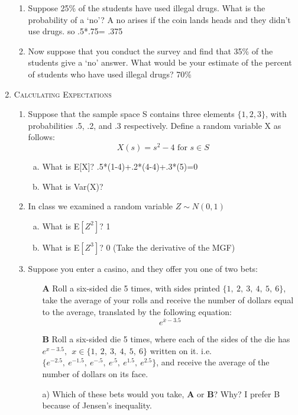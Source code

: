 \documentclass[11pt,letterpaper]{article}
\numberwithin{equation}{section}
\begin{document}
\begin{enumerate}[I]
\begin{enumerate}[1)]
\item Suppose 25\% of the students have used illegal drugs. What is the probability of a `no'?  A no arises if the coin lands heads and they didn't use drugs.  so .5*.75= .375
\item  Now suppose that you conduct the survey and find that 35\% of the students give a `no' answer. What would be your estimate of the percent of students who have used illegal drugs? 70\%
\end{enumerate}
\pagebreak
\item \textsc{Calculating Expectations}
\begin{enumerate}[1)]
\item Suppose that the sample space S contains three elements $\{1, 2, 3\}$, with probabilities .5, .2, and .3 respectively.  Define a random variable X as follows:
$$X(s) = s^2 - 4 \text{ for } s \in S$$ 
\begin{enumerate}[a)]
\item What is E[X]? .5*(1-4)+.2*(4-4)+.3*(5)=0
\item What is Var(X)? 
\end{enumerate}

\item In class we examined a random variable $Z\sim N(0,1)$ 
\begin{enumerate}[a)]
\item What is E$[Z^2]$? 1
\item What is E$[Z^3]$? 0 (Take the derivative of the MGF)
\end{enumerate}

\item Suppose you enter a casino, and they offer you one of two bets:

\begin{enumerate}
\item[\textbf{A}] Roll a six-sided die 5 times, with sides printed $\{1,\ 2,\ 3,\ 4,\ 5,\ 6\}$, take the average of your rolls and receive the number of dollars equal to the average, translated by the following equation:
$$e^{\bar{x}-3.5}$$
\item[\textbf{B}] Roll a six-sided die 5 times, where each of the sides of the die has $e^{x-3.5},\ \ x\in\{1,\ 2,\ 3,\ 4,\ 5,\ 6\}$ written on it.  i.e. $\{e^{-2.5},\ e^{-1.5},\ e^{-.5},\ e^{.5},\ e^{1.5},\ e^{2.5}\}$, and receive the average of the number of dollars on its face.
\end{enumerate}
\begin{enumerate}
\item[a)]  Which of these bets would you take, \textbf{A} or \textbf{B}?  Why? I prefer B  because of Jensen's inequality.


\end{enumerate}
\end{enumerate}
\end{enumerate}
\end{document}
